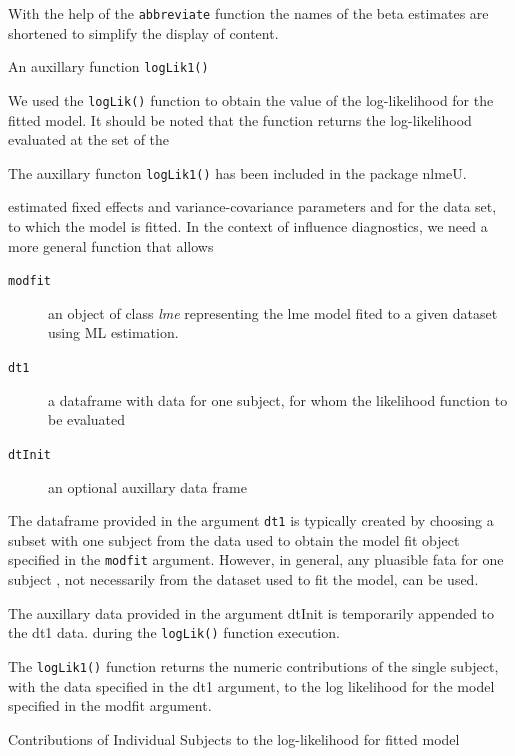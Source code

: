 \documentclass[a4paper,12pt]{article}
\begin{document}
With the help of the \texttt{abbreviate} function the names of the beta estimates are shortened to simplify the display of content.

An auxillary function \texttt{logLik1()}

We used the \texttt{logLik()} function to obtain the value of the log-likelihood for the fitted model.
It should be noted that the function returns the log-likelihood evaluated at the set of the


The auxillary functon \texttt{logLik1()} has been included in the package nlmeU.

estimated fixed effects and variance-covariance parameters and for the data set, to which the model
is fitted. In the context of influence diagnostics, we need a more general function that allows




\begin{description}
\item[ \texttt{modfit} ] an object of class \textit{lme} representing the lme model fited to a given dataset using ML estimation.
\item[ \texttt{dt1}] a dataframe with data for one subject, for whom the likelihood function to be evaluated
\item[ \texttt{dtInit }] an optional auxillary data frame
\end{description}


The dataframe provided in the argument \texttt{dt1} is typically created by choosing a subset with one subject from the data used to obtain the model fit object specified in the \texttt{modfit} argument.
However, in general, any pluasible fata for one subject , not necessarily from the dataset used to fit the model, can be used.


The auxillary data provided in the argument dtInit is temporarily appended to the dt1 data. during the \texttt{logLik()} function execution.



The \texttt{logLik1()} function returns the numeric contributions of the single subject, with the data specified in the dt1 argument, to the log likelihood
for the model specified in the modfit argument.



Contributions of Individual Subjects to the log-likelihood for fitted model
\end{document}
